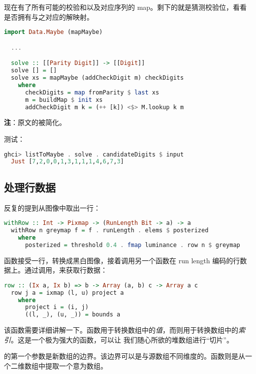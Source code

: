 \documentclass[./main.tex]{subfiles}
\begin{document}
现在有了所有可能的校验和以及对应序列的 map。剩下的就是猜测校验位，看看是否拥有与之对应的解映射。

\begin{lstlisting}[language=Haskell]
  import Data.Maybe (mapMaybe)

  ...

  solve :: [[Parity Digit]] -> [[Digit]]
  solve [] = []
  solve xs = mapMaybe (addCheckDigit m) checkDigits
    where
      checkDigits = map fromParity $ last xs
      m = buildMap $ init xs
      addCheckDigit m k = (++ [k]) <$> M.lookup k m
\end{lstlisting}

\textbf{注}：原文的被简化。

测试：

\begin{lstlisting}[language=Haskell]
  ghci> listToMaybe . solve . candidateDigits $ input
  Just [7,2,0,0,1,3,1,1,1,4,6,7,3]
\end{lstlisting}

\subsection*{处理行数据}

反复的提到从图像中取出一行：

\begin{lstlisting}[language=Haskell]
  withRow :: Int -> Pixmap -> (RunLength Bit -> a) -> a
  withRow n greymap f = f . runLength . elems $ posterized
    where
      posterized = threshold 0.4 . fmap luminance . row n $ greymap
\end{lstlisting}

函数接受一行，转换成黑白图像，接着调用另一个函数在 run length 编码的行数据上。通过调用，来获取行数据：

\begin{lstlisting}[language=Haskell]
  row :: (Ix a, Ix b) => b -> Array (a, b) c -> Array a c
  row j a = ixmap (l, u) project a
    where
      project i = (i, j)
      ((l, _), (u, _)) = bounds a
\end{lstlisting}

该函数需要详细讲解一下。函数用于转换数组中的\textit{值}，而则用于转换数组中的\textit{索引}。这是一个极为强大的函数，可以让
我们随心所欲的堆数组进行“切片”。

的第一个参数是新数组的边界。该边界可以是与源数组不同维度的。函数则是从一个二维数组中提取一个意为数组。
\end{document}
